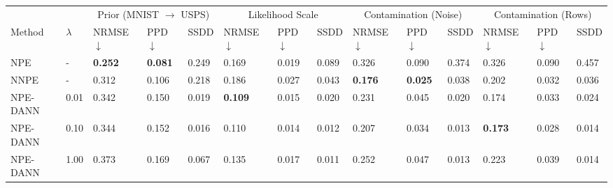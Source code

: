 \begin{tabular}{ ll |lll|lll|lll|lll }
     \toprule
            &           & \multicolumn{3}{c}{Prior (MNIST $\rightarrow$ USPS)} & \multicolumn{3}{c}{Likelihood Scale} & \multicolumn{3}{c}{Contamination (Noise)} & \multicolumn{3}{c}{Contamination (Rows)} \\
     Method & $\lambda$ & NRMSE $\downarrow$ & PPD $\downarrow$ & SSDD & NRMSE  $\downarrow$ & PPD $\downarrow$ & SSDD & NRMSE $\downarrow$ & PPD $\downarrow$ & SSDD & NRMSE $\downarrow$& PPD $\downarrow$ & SSDD \\
     \midrule
NPE & - & \cellcolor{lime!100} \textbf{0.252} & \cellcolor{lime!100} \textbf{0.081} & \cellcolor{LightSkyBlue1!0} 0.249 & \cellcolor{lime!72} 0.169 & \cellcolor{lime!91} 0.019 & \cellcolor{LightSkyBlue1!0} 0.089 & \cellcolor{lime!0} 0.326 & \cellcolor{lime!0} 0.090 & \cellcolor{LightSkyBlue1!0} 0.374 & \cellcolor{lime!0} 0.326 & \cellcolor{lime!0} 0.090 & \cellcolor{LightSkyBlue1!0} 0.457 \vspace{0.1cm}\\
NNPE & - & \cellcolor{lime!57} 0.312 & \cellcolor{lime!75} 0.106 & \cellcolor{LightSkyBlue1!12} 0.218 & \cellcolor{lime!64} 0.186 & \cellcolor{lime!79} 0.027 & \cellcolor{LightSkyBlue1!51} 0.043 & \cellcolor{lime!100} \textbf{0.176} & \cellcolor{lime!100} \textbf{0.025} & \cellcolor{LightSkyBlue1!89} 0.038 & \cellcolor{lime!81} 0.202 & \cellcolor{lime!91} 0.032 & \cellcolor{LightSkyBlue1!92} 0.036 \vspace{0.1cm}\\
NPE-DANN & 0.01 & \cellcolor{lime!36} 0.342 & \cellcolor{lime!33} 0.150 & \cellcolor{LightSkyBlue1!92} 0.019 & \cellcolor{lime!100} \textbf{0.109} & \cellcolor{lime!95} 0.015 & \cellcolor{LightSkyBlue1!77} 0.020 & \cellcolor{lime!63} 0.231 & \cellcolor{lime!68} 0.045 & \cellcolor{LightSkyBlue1!94} 0.020 & \cellcolor{lime!99} 0.174 & \cellcolor{lime!89} 0.033 & \cellcolor{LightSkyBlue1!94} 0.024 \\
NPE-DANN & 0.10 & \cellcolor{lime!34} 0.344 & \cellcolor{lime!31} 0.152 & \cellcolor{LightSkyBlue1!93} 0.016 & \cellcolor{lime!99} 0.110 & \cellcolor{lime!97} 0.014 & \cellcolor{LightSkyBlue1!86} 0.012 & \cellcolor{lime!79} 0.207 & \cellcolor{lime!86} 0.034 & \cellcolor{LightSkyBlue1!96} 0.013 & \cellcolor{lime!100} \textbf{0.173} & \cellcolor{lime!97} 0.028 & \cellcolor{LightSkyBlue1!97} 0.014 \\
NPE-DANN & 1.00 & \cellcolor{lime!13} 0.373 & \cellcolor{lime!15} 0.169 & \cellcolor{LightSkyBlue1!73} 0.067 & \cellcolor{lime!88} 0.135 & \cellcolor{lime!93} 0.017 & \cellcolor{LightSkyBlue1!87} 0.011 & \cellcolor{lime!49} 0.252 & \cellcolor{lime!66} 0.047 & \cellcolor{LightSkyBlue1!96} 0.013 & \cellcolor{lime!67} 0.223 & \cellcolor{lime!80} 0.039 & \cellcolor{LightSkyBlue1!96} 0.014 \vspace{0.1cm}\\

\end{tabular}
